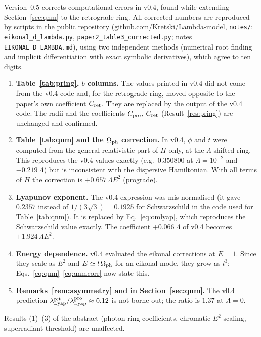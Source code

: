 \documentclass[12pt,a4paper]{article}
\newcommand{\Omph}{\Omega_{\rm ph}}
\newcommand{\lLyap}{\lambda_{\rm Lyap}}
\begin{document}
Version~0.5 corrects computational errors in v0.4, found while extending
Section~\ref{sec:qnm} to the retrograde ring. All corrected numbers are
reproduced by scripts in the public repository (github.com/Kretski/Lambda-model,
\texttt{notes/}: \texttt{eikonal\_d\_lambda.py}, \texttt{paper2\_table3\_corrected.py};
notes \texttt{EIKONAL\_D\_LAMBDA.md}), using two independent methods
(numerical root finding and implicit differentiation with exact symbolic
derivatives), which agree to ten digits.
\begin{enumerate}
  \item \textbf{Table~\ref{tab:pring}, $b$ columns.} The values printed in v0.4
    did not come from the v0.4 code and, for the retrograde ring, moved
    opposite to the paper's own coefficient $C_{\rm ret}$. They are replaced
    by the output of the v0.4 code. The radii and the coefficients
    $C_{\rm pro}$, $C_{\rm ret}$ (Result~\ref{res:pring}) are unchanged and confirmed.
  \item \textbf{Table~\ref{tab:qnm} and the $\Omph$ correction.} In v0.4, $\dot\phi$
    and $\dot t$ were computed from the general-relativistic part of $H$ only,
    at the $\Lambda$-shifted ring. This reproduces the v0.4 values exactly
    (e.g.\ $0.350800$ at $\Lambda=10^{-2}$ and $-0.219\,\Lambda$) but is inconsistent
    with the dispersive Hamiltonian. With all terms of $H$ the correction is
    $+0.657\,\Lambda E^2$ (prograde).
  \item \textbf{Lyapunov exponent.} The v0.4 expression was mis-normalised
    (it gave $0.2357$ instead of $1/(3\sqrt3)=0.1925$ for Schwarzschild in the
    code used for Table~\ref{tab:qnm}). It is replaced by Eq.~\eqref{eq:omlyap},
    which reproduces the Schwarzschild value exactly. The coefficient
    $+0.066\,\Lambda$ of v0.4 becomes $+1.924\,\Lambda E^2$.
  \item \textbf{Energy dependence.} v0.4 evaluated the eikonal corrections at
    $E=1$. Since they scale as $E^2$ and $E\simeq l\,\Omph$ for an eikonal mode,
    they grow as $l^3$; Eqs.~\eqref{eq:qnm}--\eqref{eq:qnmcorr} now state this.
  \item \textbf{Remarks~\ref{rem:asymmetry} and in Section~\ref{sec:qnm}.} The v0.4 prediction
    $\lLyap^{\rm ret}/\lLyap^{\rm pro}\approx0.12$ is not borne out; the ratio is
    $1.37$ at $\Lambda=0$.
\end{enumerate}
Results (1)--(3) of the abstract (photon-ring coefficients, chromatic $E^2$
scaling, superradiant threshold) are unaffected.
\end{document}
